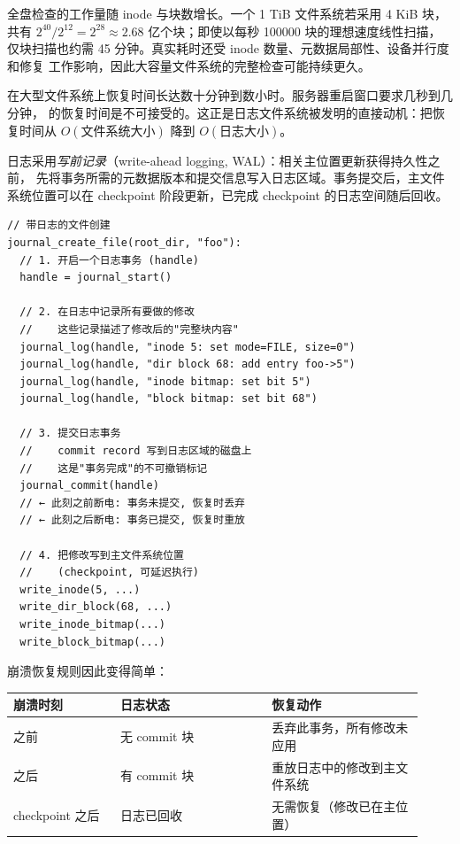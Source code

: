 \begin{filesystemlayout}
全盘检查的工作量随 inode 与块数增长。一个 1 TiB 文件系统若采用 4 KiB 块，共有
$2^{40}/2^{12}=2^{28}\approx2.68$ 亿个块；即使以每秒 100000 块的理想速度线性扫描，
仅块扫描也约需 45 分钟。真实耗时还受 inode 数量、元数据局部性、设备并行度和修复
工作影响，因此大容量文件系统的完整检查可能持续更久。

\begin{warningbox}
 在大型文件系统上恢复时间长达数十分钟到数小时。服务器重启窗口要求几秒到几分钟， 的恢复时间是不可接受的。这正是日志文件系统被发明的直接动机：把恢复时间从 $O(\text{文件系统大小})$ 降到 $O(\text{日志大小})$。
\end{warningbox}


日志采用\emph{写前记录}（write-ahead logging, WAL）：相关主位置更新获得持久性之前，
先将事务所需的元数据版本和提交信息写入日志区域。事务提交后，主文件系统位置可以在
checkpoint 阶段更新，已完成 checkpoint 的日志空间随后回收。

\begin{lstlisting}
// 带日志的文件创建
journal_create_file(root_dir, "foo"):
  // 1. 开启一个日志事务 (handle)
  handle = journal_start()

  // 2. 在日志中记录所有要做的修改
  //    这些记录描述了修改后的"完整块内容"
  journal_log(handle, "inode 5: set mode=FILE, size=0")
  journal_log(handle, "dir block 68: add entry foo->5")
  journal_log(handle, "inode bitmap: set bit 5")
  journal_log(handle, "block bitmap: set bit 68")

  // 3. 提交日志事务
  //    commit record 写到日志区域的磁盘上
  //    这是"事务完成"的不可撤销标记
  journal_commit(handle)
  // ← 此刻之前断电: 事务未提交, 恢复时丢弃
  // ← 此刻之后断电: 事务已提交, 恢复时重放

  // 4. 把修改写到主文件系统位置
  //    (checkpoint, 可延迟执行)
  write_inode(5, ...)
  write_dir_block(68, ...)
  write_inode_bitmap(...)
  write_block_bitmap(...)
\end{lstlisting}

崩溃恢复规则因此变得简单：

\begin{longtable}{|F{0.24\linewidth}|F{0.34\linewidth}|F{0.34\linewidth}|}
\toprule
{}
崩溃时刻 & 日志状态 & 恢复动作 \\
\midrule
{} 之前 & 无 commit 块 & 丢弃此事务，所有修改未应用 \\\tablerowrule
{} 之后 & 有 commit 块 & 重放日志中的修改到主文件系统 \\\tablerowrule
checkpoint 之后 & 日志已回收 & 无需恢复（修改已在主位置） \\
\bottomrule
\end{longtable}


\end{filesystemlayout}

